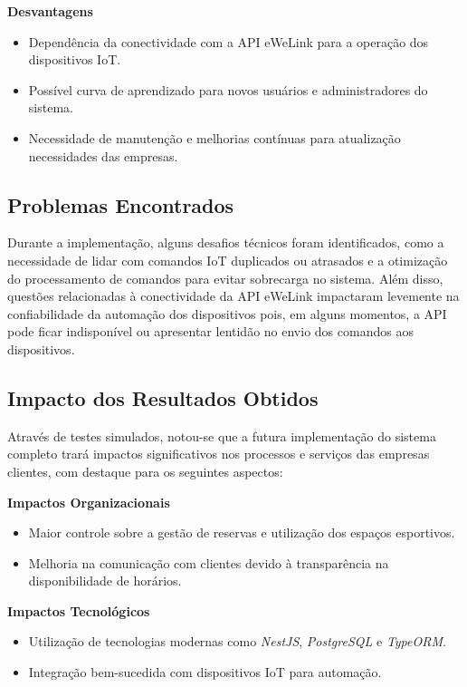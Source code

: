 \textbf{Desvantagens}\\
\begin{itemize}
    \item Dependência da conectividade com a API eWeLink para a operação dos dispositivos IoT.
    \item Possível curva de aprendizado para novos usuários e administradores do sistema.
    \item Necessidade de manutenção e melhorias contínuas para atualização necessidades das empresas.
\end{itemize}

\subsection{Problemas Encontrados}

Durante a implementação, alguns desafios técnicos foram identificados, como a necessidade de lidar com comandos IoT duplicados ou atrasados e a otimização do processamento de comandos para evitar sobrecarga no sistema. Além disso, questões relacionadas à conectividade da API eWeLink impactaram levemente na confiabilidade da automação dos dispositivos pois, em alguns momentos, a API pode ficar indisponível ou apresentar lentidão no envio dos comandos aos dispositivos.

\subsection{Impacto dos Resultados Obtidos}

Através de testes simulados, notou-se que a futura implementação do sistema completo trará impactos significativos nos processos e serviços das empresas clientes, com destaque para os seguintes aspectos:

\textbf{Impactos Organizacionais}\\
\begin{itemize}
    \item Maior controle sobre a gestão de reservas e utilização dos espaços esportivos.
    \item Melhoria na comunicação com clientes devido à transparência na disponibilidade de horários.
\end{itemize}

\textbf{Impactos Tecnológicos}\\
\begin{itemize}
    \item Utilização de tecnologias modernas como \textit{NestJS}, \textit{PostgreSQL} e \textit{TypeORM}.
    \item Integração bem-sucedida com dispositivos IoT para automação.
\end{itemize}

